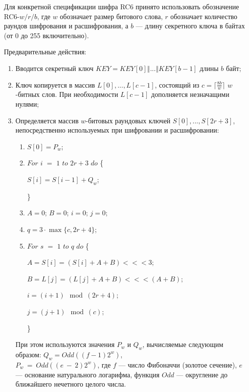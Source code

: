 \documentclass{./civarticle}
\begin{document}
Для конкретной спецификации шифра RC6 принято использовать обозначение RC6-$w/r/b$, где $w$ обозначает размер битового слова, $r$ обозначает количество раундов шифрования и расшифрования, а $b$ --- длину секретного ключа в байтах (от 0 до 255 включительно).  

Предварительные действия:

\begin{enumerate}
    \item Вводится секретный ключ $KEY = KEY[0] \mathbin\Vert ... \mathbin\Vert KEY[b-1]$ длины $b$ байт;

    \item Ключ копируется в массив $L[0], ..., L[c-1]$, состоящий из $c =\lceil \frac{8b}{w} \rceil$ $w$-битных слов. При необходимости $L[c-1]$ дополняется незначащими нулями;

    \item Определяется массив $w$-битовых раундовых ключей $S[0], ..., S[2r+3]$, непосредственно используемых при шифровании и расшифровании:

    \begin{enumerate}
        \item $S[0] = P_{w}$;

        \item $For$ $i$ $=$ $1$ $to$ $2r + 3$ $do$ \{ 

        \hspace{0.5cm} $S[i] = S[i-1] + Q_{w}$;
    
        \}

        \item $A = 0$; $B = 0$; $i = 0$; $j = 0$;

        \item $q = 3\cdot \max\{c, 2r + 4\}$;

        \item $For$ $s$ $=$ $1$ $to$ $q$ $do$ \{ 

        \hspace{0.5cm} $A = S[i] = (S[i] + A + B) <<< 3$;

        \hspace{0.5cm} $B = L[j] = (L[j] + A + B) <<< (A + B)$;

        \hspace{0.5cm} $i = (i + 1) \mod (2r + 4)$;

        \hspace{0.5cm} $j = (j + 1) \mod (c)$;
    
        \}
    \end{enumerate}
    При этом используются значения $P_w$ и $Q_w$, вычисляемые следующим образом: $Q_w = Odd((f - 1)2^w)$, \\$P_w~=~Odd((e~-~2)2^w)$, где $f$ --- число Фибоначчи (золотое сечение), $e$ --- основание натурального логарифма, функция $Odd$ ---  округление до ближайшего нечетного целого числа.
\end{enumerate}
\end{document}
